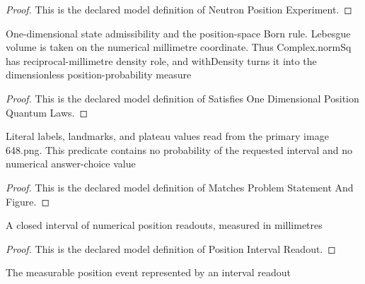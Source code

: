 \begin{proof}
  This is the declared model definition of Neutron Position Experiment.
\end{proof}
\begin{definition}
  \label{def:physics:phyx-mini-0648:phyxminiproblems-problemphyxmini0648-satisfiesonedimensionalpositionquantumlaws}
  One-dimensional state admissibility and the position-space Born rule. Lebesgue volume is taken on the numerical millimetre coordinate. Thus Complex.normSq has reciprocal-millimetre density role, and withDensity turns it into the dimensionless position-probability measure
\end{definition}
\begin{proof}
  This is the declared model definition of Satisfies One Dimensional Position Quantum Laws.
\end{proof}
\begin{definition}
  \label{def:physics:phyx-mini-0648:phyxminiproblems-problemphyxmini0648-matchesproblemstatementandfigure}
  Literal labels, landmarks, and plateau values read from the primary image 648.png. This predicate contains no probability of the requested interval and no numerical answer-choice value
\end{definition}
\begin{proof}
  This is the declared model definition of Matches Problem Statement And Figure.
\end{proof}
\begin{definition}
  \label{def:physics:phyx-mini-0648:phyxminiproblems-problemphyxmini0648-positionintervalreadout}
  A closed interval of numerical position readouts, measured in millimetres
\end{definition}
\begin{proof}
  This is the declared model definition of Position Interval Readout.
\end{proof}
\begin{definition}[region]
  \label{def:physics:phyx-mini-0648:phyxminiproblems-problemphyxmini0648-positionintervalreadout-region}
  The measurable position event represented by an interval readout
\end{definition}
